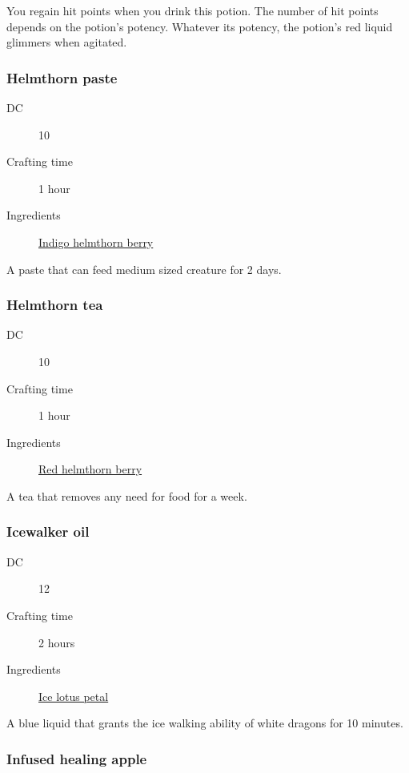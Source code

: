 You regain hit points when you drink this potion. The number of hit points depends on the potion's potency. Whatever its potency, the potion's red liquid glimmers when agitated. 

\subsubsection{Helmthorn paste}
\label{Helmthorn paste}

\begin{description}
\item [DC] 10 \survival
\item [Crafting time] 1 hour
\item [Ingredients] \hyperref[Helmthorn]{Indigo helmthorn berry}
\end{description}

A paste that can feed medium sized creature for 2 days.

\subsubsection{Helmthorn tea}
\label{Helmthorn tea}

\begin{description}
\item [DC] 10 \survival
\item [Crafting time] 1 hour
\item [Ingredients] \hyperref[Helmthorn]{Red helmthorn berry}
\end{description}

A tea that removes any need for food for a week.

\subsubsection{Icewalker oil}
\label{Icewalker oil}

\begin{description}
\item [DC] 12 \survival
\item [Crafting time] 2 hours
\item [Ingredients] \hyperref[Ice Lotus]{Ice lotus petal}
\end{description}

A blue liquid that grants the ice walking ability of white dragons for 10 minutes.

\subsubsection{Infused healing apple}
\label{Infused healing apple}


